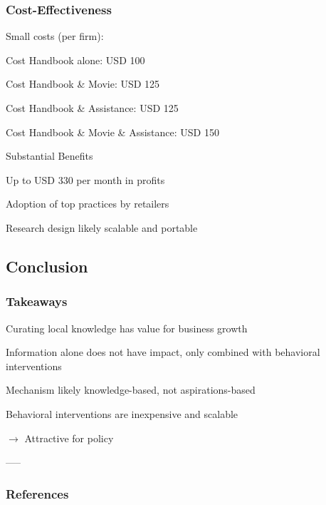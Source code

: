 \documentclass[hideothersubsections, usenames,dvipsnames,11pt]{beamer}
\newenvironment{itemize_2pt}{\itemize\addtolength{\itemsep}{2pt}}{\enditemize}
\begin{document}
\begin{frame}
\frametitle{Cost-Effectiveness}

\textcolor{bdf}{Small costs (per firm)}:
\begin{itemize_2pt}
\item Cost Handbook alone: USD 100
\item Cost Handbook \& Movie: USD 125
\item Cost Handbook \& Assistance: USD 125
\item Cost Handbook \& Movie \& Assistance: USD 150
\end{itemize_2pt}
\vspace{0.5em}

\textcolor{bdf}{Substantial Benefits}
\begin{itemize_2pt}
\item Up to USD 330 per month in profits
\item Adoption of top practices by retailers
\end{itemize_2pt}

\vspace{0.5em}
Research design likely \textcolor{bdf}{scalable and portable}

\end{frame}

\subsection{Conclusion}
\begin{frame}
\frametitle{Takeaways}
\begin{itemize_2pt}
    \item \textcolor{bdf}{Curating local knowledge has value for business growth} 
    \item Information alone does not have impact, only combined with \textcolor{bdf}{behavioral interventions}
    \item Mechanism likely \textcolor{bdf}{knowledge-based}, not aspirations-based
	\item Behavioral interventions are \textcolor{bdf}{inexpensive and scalable}
	\item[] $\rightarrow$  Attractive for policy
    
\end{itemize_2pt}
\end{frame}

-----


\begin{frame}[label=references, allowframebreaks]
\frametitle{References}


\end{frame}
\end{document}
